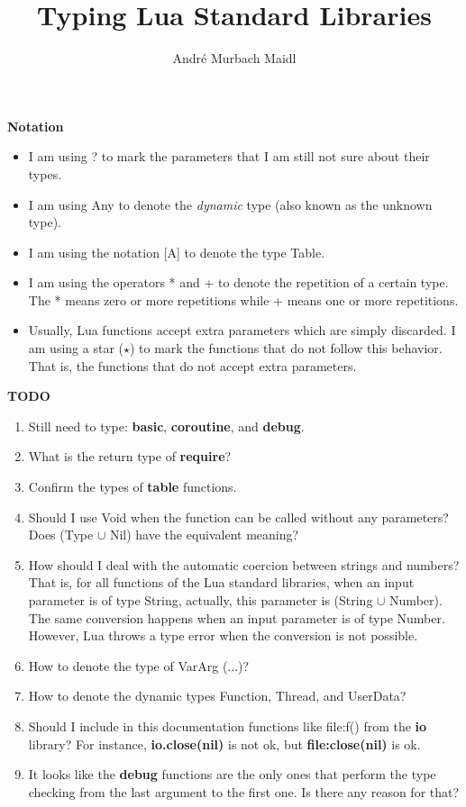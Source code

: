 \documentclass[12pt]{article}
\title{Typing Lua Standard Libraries}
\author{André Murbach Maidl}
\begin{document}
\maketitle

\textbf{Notation}

\begin{itemize}
\item I am using ? to mark the parameters that I am still not
sure about their types.
\item I am using Any to denote the \textit{dynamic} type
(also known as the unknown type).
\item I am using the notation [A] to denote the type Table.
\item I am using the operators * and + to denote the repetition
of a certain type. The * means zero or more repetitions while +
means one or more repetitions.
\item Usually, Lua functions accept extra parameters which are
simply discarded.
I am using a star ($\star$) to mark the functions that do not
follow this behavior.
That is, the functions that do not accept extra parameters.
\end{itemize}

\newpage

\textbf{TODO}

\begin{enumerate}
\item Still need to type: \textbf{basic}, \textbf{coroutine},
and \textbf{debug}.
\item What is the return type of \textbf{require}?
\item Confirm the types of \textbf{table} functions.
\item Should I use Void when the function can be called without any
parameters? Does (Type $\cup$ Nil) have the equivalent meaning?
\item How should I deal with the automatic coercion between
strings and numbers?
That is, for all functions of the Lua standard libraries,
when an input parameter is of type String, actually, this
parameter is (String $\cup$ Number).
The same conversion happens when an input parameter is of type
Number.
However, Lua throws a type error when the conversion is not
possible.
\item How to denote the type of VarArg (...)?
\item How to denote the dynamic types Function, Thread, and UserData?
\item Should I include in this documentation functions like
file:f() from the \textbf{io} library?
For instance, \textbf{io.close(nil)} is not ok, but
\textbf{file:close(nil)} is ok.
\item It looks like the \textbf{debug} functions are the only ones
that perform the type checking from the last argument to the first
one.
Is there any reason for that?
\end{enumerate}
\end{document}
